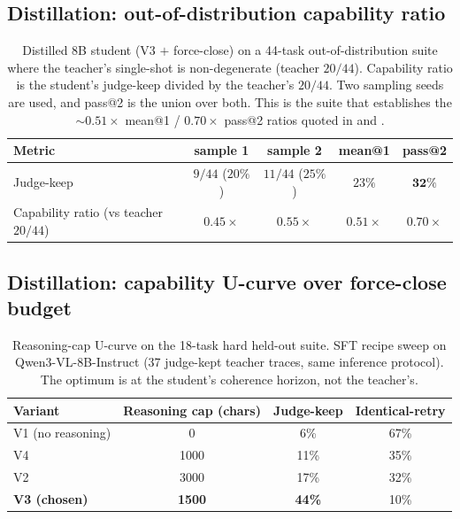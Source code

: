 \subsection{Distillation: out-of-distribution capability ratio}
\begin{table}[H]
\centering
\caption{Distilled 8B student (V3 $+$ force-close) on a 44-task out-of-distribution suite where the teacher's single-shot is non-degenerate (teacher $20/44$). Capability ratio is the student's judge-keep divided by the teacher's $20/44$. Two sampling seeds are used, and pass@2 is the union over both. This is the suite that establishes the ${\sim}0.51\times$ mean@1 / $0.70\times$ pass@2 ratios quoted in  and .}
\label{tab:distill-ood}
\small
\begin{tabular}{lcccc}
\toprule
Metric & sample 1 & sample 2 & mean@1 & pass@2 \\
\midrule
Judge-keep                              & $9/44$ ($20\%$) & $11/44$ ($25\%$) & $23\%$        & $\mathbf{32\%}$ \\
Capability ratio (vs teacher $20/44$)   & $0.45\times$    & $0.55\times$     & $0.51\times$  & $\mathbf{0.70\times}$ \\
\bottomrule
\end{tabular}
\end{table}

\subsection{Distillation: capability U-curve over force-close budget}
\begin{table}[H]
\centering
\caption{Reasoning-cap U-curve on the 18-task hard held-out suite. SFT recipe sweep on Qwen3-VL-8B-Instruct (37 judge-kept teacher traces, same inference protocol). The optimum is at the student's coherence horizon, not the teacher's.}
\label{tab:distill-ucurve}
\begin{tabular}{lccc}
\toprule
Variant & Reasoning cap (chars) & Judge-keep & Identical-retry \\
\midrule
V1 (no reasoning)     & 0    & 6\%  & 67\% \\
V4                    & 1000 & 11\% & 35\% \\
V2                    & 3000 & 17\% & 32\% \\
\textbf{V3 (chosen)}  & \textbf{1500} & \textbf{44\%} & 10\% \\
\bottomrule
\end{tabular}
\end{table}

